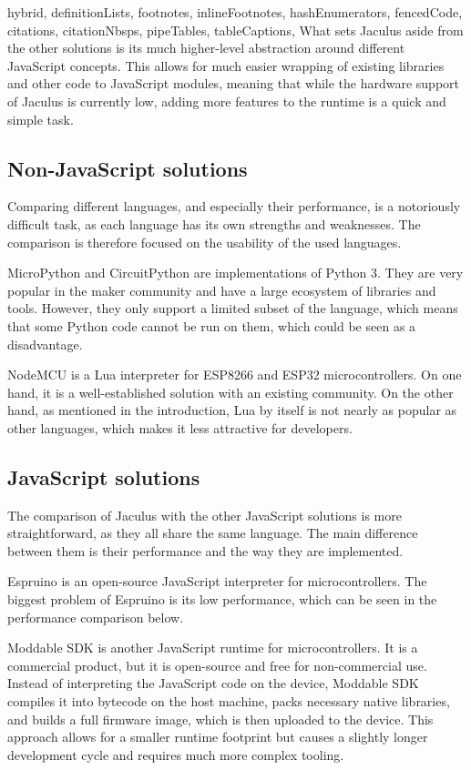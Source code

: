 \begin{markdown*}{%
  hybrid,
  definitionLists,
  footnotes,
  inlineFootnotes,
  hashEnumerators,
  fencedCode,
  citations,
  citationNbsps,
  pipeTables,
  tableCaptions,
}
What sets Jaculus aside from the other solutions is its much higher-level abstraction around different JavaScript concepts. This allows for much easier wrapping of existing libraries and other code to JavaScript modules, meaning that while the hardware support of Jaculus is currently low, adding more features to the runtime is a quick and simple task.

\subsection{Non-JavaScript solutions}

Comparing different languages, and especially their performance, is a notoriously difficult task, as each language has its own strengths and weaknesses. The comparison is therefore focused on the usability of the used languages.

MicroPython and CircuitPython are implementations of Python 3. They are very popular in the maker community and have a large ecosystem of libraries and tools. However, they only support a limited subset of the language, which means that some Python code cannot be run on them, which could be seen as a disadvantage.

NodeMCU is a Lua interpreter for ESP8266 and ESP32 microcontrollers. On one hand, it is a well-established solution with an existing community. On the other hand, as mentioned in the introduction, Lua by itself is not nearly as popular as other languages, which makes it less attractive for developers.

\subsection{JavaScript solutions}

The comparison of Jaculus with the other JavaScript solutions is more straightforward, as they all share the same language. The main difference between them is their performance and the way they are implemented.

Espruino is an open-source JavaScript interpreter for microcontrollers. The biggest problem of Espruino is its low performance, which can be seen in the performance comparison below.

Moddable SDK is another JavaScript runtime for microcontrollers. It is a commercial product, but it is open-source and free for non-commercial use. Instead of interpreting the JavaScript code on the device, Moddable SDK compiles it into bytecode on the host machine, packs necessary native libraries, and builds a full firmware image, which is then uploaded to the device. This approach allows for a smaller runtime footprint but causes a slightly longer development cycle and requires much more complex tooling.


\end{markdown*}
